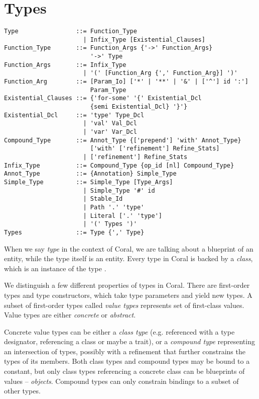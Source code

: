 
\chapter{Types}

\syntax\begin{lstlisting}
Type                ::= Function_Type
                      | Infix_Type [Existential_Clauses]
Function_Type       ::= Function_Args {'->' Function_Args} 
                        '->' Type
Function_Args       ::= Infix_Type
                      | '(' [Function_Arg {',' Function_Arg}] ')'
Function_Arg        ::= [Param_Io] ['*' | '**' | '&' | ['^'] id ':'] 
                        Param_Type
Existential_Clauses ::= {'for-some' '{' Existential_Dcl
                        {semi Existential_Dcl} '}'}
Existential_Dcl     ::= 'type' Type_Dcl
                      | 'val' Val_Dcl
                      | 'var' Var_Dcl
Compound_Type       ::= Annot_Type {['prepend'] 'with' Annot_Type} 
                        ['with' ['refinement'] Refine_Stats]
                      | ['refinement'] Refine_Stats
Infix_Type          ::= Compound_Type {op_id [nl] Compound_Type}
Annot_Type          ::= {Annotation} Simple_Type
Simple_Type         ::= Simple_Type [Type_Args]
                      | Simple_Type '#' id
                      | Stable_Id
                      | Path '.' 'type'
                      | Literal ['.' 'type']
                      | '(' Types ')'
Types               ::= Type {',' Type}
\end{lstlisting}

When we say \textit{type} in the context of Coral, we are talking about a blueprint of an entity, while the type itself is an entity. Every type in Coral is backed by a \textit{class}, which is an instance of the type \lstinline@Class@. 

We distinguish a few different properties of types in Coral. There are first-order types and type constructors, which take type parameters and yield new types. A subset of first-order types called \textit{value types} represents set of first-class values. Value types are either \textit{concrete} or \textit{abstract}. 

Concrete value types can be either a \textit{class type} (e.g. referenced with a type designator, referencing a class or maybe a trait), or a \textit{compound type} representing an intersection of types, possibly with a refinement that further constrains the types of its members. Both class types and compound types may be bound to a constant, but only class types referencing a concrete class can be blueprints of values -- \textit{objects}. Compound types can only constrain bindings to a subset of other types. 


